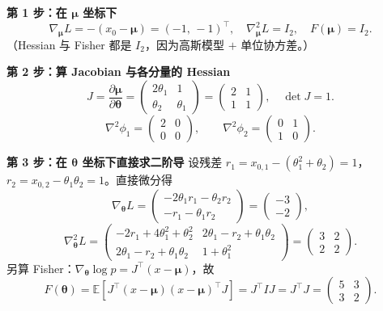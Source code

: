 \documentclass[11pt,a4paper]{article}
\theoremstyle{mythm}
\theoremstyle{mydef}
\newcommand{\E}{\mathbb{E}}
\begin{document}
\textbf{第 1 步：在 $\boldsymbol\mu$ 坐标下}
$$\nabla_{\boldsymbol\mu} L = -(x_0 - \boldsymbol\mu) = (-1,\, -1)^\top,\quad \nabla^2_{\boldsymbol\mu} L = I_2,\quad F(\boldsymbol\mu) = I_2.$$
（Hessian 与 Fisher 都是 $I_2$，因为高斯模型 $+$ 单位协方差。）

\textbf{第 2 步：算 Jacobian 与各分量的 Hessian}
$$J = \frac{\partial \boldsymbol\mu}{\partial \boldsymbol\theta} = \begin{pmatrix} 2\theta_1 & 1\\ \theta_2 & \theta_1\end{pmatrix} = \begin{pmatrix} 2 & 1\\ 1 & 1\end{pmatrix},\quad \det J = 1.$$
$$\nabla^2 \phi_1 = \begin{pmatrix}2 & 0\\ 0 & 0\end{pmatrix},\qquad \nabla^2 \phi_2 = \begin{pmatrix}0 & 1\\ 1 & 0\end{pmatrix}.$$

\textbf{第 3 步：在 $\boldsymbol\theta$ 坐标下直接求二阶导}
设残差 $r_1 = x_{0,1} - (\theta_1^2 + \theta_2) = 1$，$r_2 = x_{0,2} - \theta_1\theta_2 = 1$。直接微分得
$$\nabla_{\boldsymbol\theta} L = \begin{pmatrix} -2\theta_1 r_1 - \theta_2 r_2\\ -r_1 - \theta_1 r_2\end{pmatrix} = \begin{pmatrix} -3\\ -2\end{pmatrix},$$
$$\nabla^2_{\boldsymbol\theta} L = \begin{pmatrix}-2r_1 + 4\theta_1^2 + \theta_2^2 & 2\theta_1 - r_2 + \theta_1\theta_2\\ 2\theta_1 - r_2 + \theta_1\theta_2 & 1 + \theta_1^2\end{pmatrix} = \boxed{\begin{pmatrix}3 & 2\\ 2 & 2\end{pmatrix}}.$$
另算 Fisher：$\nabla_{\boldsymbol\theta}\log p = J^\top(x - \boldsymbol\mu)$，故
$$F(\boldsymbol\theta) = \E\!\left[J^\top(x-\boldsymbol\mu)(x-\boldsymbol\mu)^\top J\right] = J^\top I J = J^\top J = \boxed{\begin{pmatrix}5 & 3\\ 3 & 2\end{pmatrix}}.$$
\end{document}
